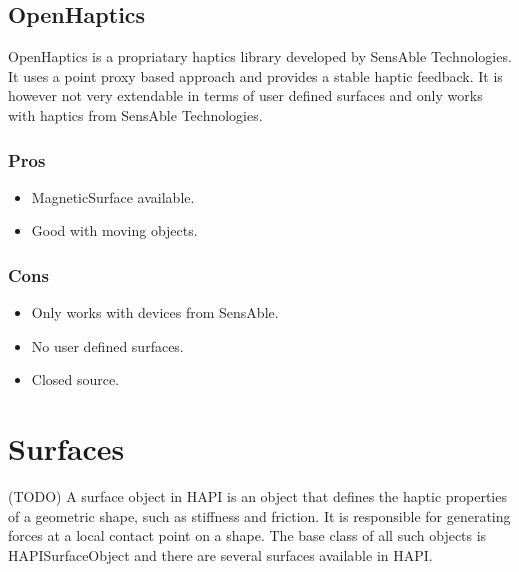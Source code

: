 \subsection{OpenHaptics}
OpenHaptics \cite{openhaptics} is a propriatary haptics library developed by SensAble Technologies. It uses a point proxy based approach and provides a stable haptic feedback. It is however not very extendable in terms of user defined surfaces and only works with haptics from SensAble Technologies.

\begin{minipage}[t]{3in}
\subsubsection{Pros}
\begin{itemize}
\item MagneticSurface available.
\item Good with moving objects.
\end{itemize}
\end{minipage}
\begin{minipage}[t]{3in}
\subsubsection{Cons}
\begin{itemize}
\item Only works with devices from SensAble.
\item No user defined surfaces.
\item Closed source.
\end{itemize}
\end{minipage}


\section{Surfaces}
(TODO)
A surface object in HAPI is an object that defines the haptic properties of a geometric shape, such as stiffness and friction. It is responsible for generating forces at a local contact point on a shape. The base class of all such objects is HAPISurfaceObject and there are several surfaces available in HAPI. 

